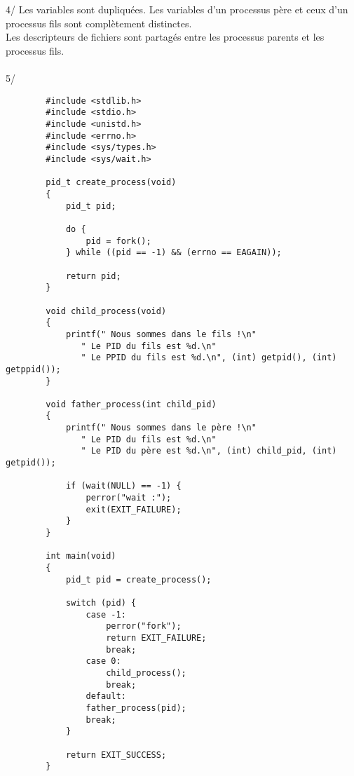 \documentclass[a4paper,11pt]{article}
\begin{document}
	\\~\\
	4/ Les variables sont dupliquées. Les variables d'un processus père et ceux d'un processus fils sont complètement distinctes.\\
	Les descripteurs de fichiers sont partagés entre les processus parents et les processus fils.
	\\~\\
	5/ 
		\begin{lstlisting}
		#include <stdlib.h>
		#include <stdio.h>
		#include <unistd.h>
		#include <errno.h>
		#include <sys/types.h>
		#include <sys/wait.h>

		pid_t create_process(void)
		{
			pid_t pid;

			do {
				pid = fork();
			} while ((pid == -1) && (errno == EAGAIN));

			return pid;
		}

		void child_process(void)
		{
			printf(" Nous sommes dans le fils !\n"
			   " Le PID du fils est %d.\n"
			   " Le PPID du fils est %d.\n", (int) getpid(), (int) getppid());
		}

		void father_process(int child_pid)
		{
			printf(" Nous sommes dans le père !\n"
			   " Le PID du fils est %d.\n"
			   " Le PID du père est %d.\n", (int) child_pid, (int) getpid());

			if (wait(NULL) == -1) {
				perror("wait :");
				exit(EXIT_FAILURE);
			}
		}

		int main(void)
		{
			pid_t pid = create_process();

			switch (pid) {
				case -1:
					perror("fork");
					return EXIT_FAILURE;
					break;
				case 0:
					child_process();
					break;
				default:
				father_process(pid);
				break;
			}
			
			return EXIT_SUCCESS;
		}
		\end{lstlisting}
		
\end{document}
